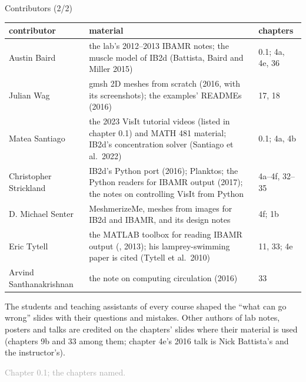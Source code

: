 \documentclass[aspectratio=169,11pt]{beamer}
\newcommand{\sourcecredit}[1]{\vfill\begin{flushright}\tiny\textcolor{DarkGray}{#1}\end{flushright}}
\begin{document}
\begin{frame}{Contributors (2/2)}
\label{fr:people2}
\scriptsize
\renewcommand{\arraystretch}{1.0}
\begin{tabular}{@{}L{0.18\textwidth}L{0.6\textwidth}L{0.16\textwidth}@{}}
\toprule
contributor & material & chapters\\
\midrule
Austin Baird & the lab's 2012--2013 IBAMR notes; the muscle model of IB2d (Battista, Baird and Miller 2015) & 0.1; 4a, 4e, 36\\
Julian Wag & gmsh 2D meshes from scratch (2016, with its screenshots); the examples' READMEs (2016) & 17, 18\\
Matea Santiago & the 2023 VisIt tutorial videos (listed in chapter 0.1) and MATH 481 material; IB2d's concentration solver (Santiago et al.\ 2022) & 0.1; 4a, 4b\\
Christopher Strickland & IB2d's Python port (2016); Planktos; the Python readers for IBAMR output (2017); the notes on controlling VisIt from Python & 4a--4f, 32--35\\
D. Michael Senter & MeshmerizeMe, meshes from images for IB2d and IBAMR, and its design notes & 4f; 1b\\
Eric Tytell & the MATLAB toolbox for reading IBAMR output (, 2013); his lamprey-swimming paper is cited (Tytell et al.\ 2010) & 11, 33; 4e\\
Arvind Santhanakrishnan & the note on computing circulation (2016) & 33\\
\bottomrule
\end{tabular}
\vspace{1mm}

\footnotesize The students and teaching assistants of every course shaped the ``what can go wrong'' slides with their questions and mistakes. Other authors of lab notes, posters and talks are credited on the chapters' slides where their material is used (chapters 9b and 33 among them; chapter 4e's 2016 talk is Nick Battista's and the instructor's).
\sourcecredit{Chapter 0.1; the chapters named.}
\end{frame}
\end{document}
